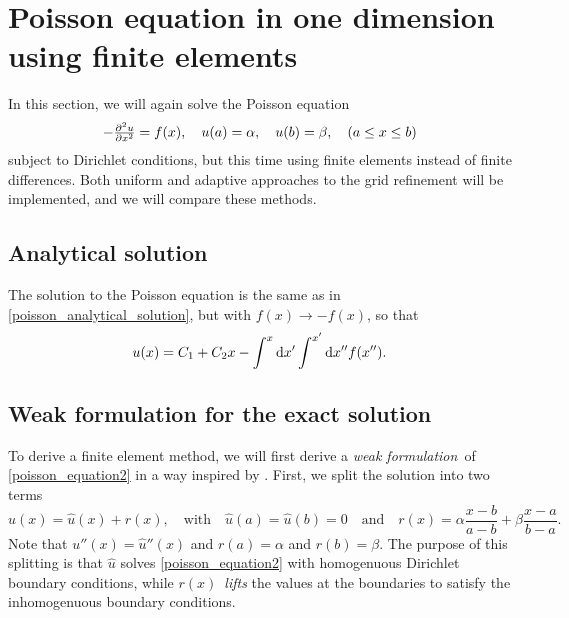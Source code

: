 \section{Poisson equation in one dimension using finite elements}

\newcommand\basisexpand[2]{\sum_{i=0}^{M+1} #1_i \varphi_i(#2)}

In this section, we will again solve the Poisson equation
\begin{equation}
	-\pd[2]{u}{x} = f(x), \quad u(a) = \alpha, \quad u(b) = \beta, \quad (a \leq x \leq b)
	\label{poisson_equation2}
\end{equation}
subject to Dirichlet conditions, but this time using finite elements instead of finite differences.
Both uniform and adaptive approaches to the grid refinement will be implemented, and we will compare these methods.

\subsection{Analytical solution}

The solution to the Poisson equation is the same as in \ref{poisson_analytical_solution}, but with $f(x) \rightarrow -f(x)$, so that
\begin{equation}
u(x) = C_1 + C_2 x - \int^x \dif x' \int^{x'} \dif x'' f(x'').
\label{poisson_analytical_solution2}
\end{equation}

\subsection{Weak formulation for the exact solution}

To derive a finite element method, we will first derive a \emph{weak formulation} of \ref{poisson_equation2} in a way inspired by \cite{curry}.
First, we split the solution into two terms
\begin{equation}
	u(x) = \hat{u}(x) + r(x), \quad \text{with} \quad \hat{u}(a) = \hat{u}(b) = 0 \quad \text{and} \quad r(x) = \alpha \frac{x-b}{a-b} + \beta \frac{x-a}{b-a}.
	\label{splitting_exact}
\end{equation}
Note that $u''(x) = \hat{u}''(x)$ and $r(a) = \alpha$ and $r(b) = \beta$.
The purpose of this splitting is that $\hat{u}$ solves \ref{poisson_equation2} with homogenuous Dirichlet boundary conditions, while $r(x)$ \emph{lifts} the values at the boundaries to satisfy the inhomogenuous boundary conditions.

